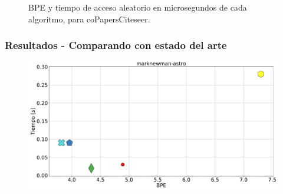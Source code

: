 \begin{frame}
\begin{figure}
\begin{minipage}{1\textwidth}
\begin{minipage}{0.15\textwidth}
    		\end{minipage}	
    	\end{minipage}

	\caption{BPE y tiempo de acceso aleatorio en microsegundos de cada algoritmo, para coPapersCiteseer.}
\end{figure}

\end{frame}





\begin{frame}
\frametitle{Resultados - Comparando con estado del arte}

\begin{figure}
	\centering
	
    	\begin{minipage}{1\textwidth}
    		\centering
    		\begin{minipage}{0.8\textwidth}
    			\centering
    			\includegraphics[width=1\linewidth]{../img/bpeTimes/secuencial/marknewman-astro.pdf}
    		\end{minipage}
    		\begin{minipage}{0.15\textwidth}
    			\centering

\end{minipage}
\end{minipage}
\end{figure}
\end{frame}
